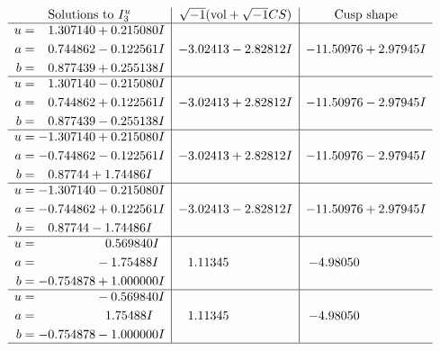 \documentclass[1p]{elsarticle_modified}
\theoremstyle{definition}
\newcommand{\I}{\sqrt{-1}}
\begin{document}
$$\begin{array}{c|c|c}  
\text{Solutions to }I^u_{3}& \I (\text{vol} + \sqrt{-1}CS) & \text{Cusp shape}\\
 \hline 
\begin{aligned}
u &= \phantom{-}1.307140 + 0.215080 I \\
a &= \phantom{-}0.744862 - 0.122561 I \\
b &= \phantom{-}0.877439 + 0.255138 I\end{aligned}
 & -3.02413 - 2.82812 I & -11.50976 + 2.97945 I \\ \hline\begin{aligned}
u &= \phantom{-}1.307140 - 0.215080 I \\
a &= \phantom{-}0.744862 + 0.122561 I \\
b &= \phantom{-}0.877439 - 0.255138 I\end{aligned}
 & -3.02413 + 2.82812 I & -11.50976 - 2.97945 I \\ \hline\begin{aligned}
u &= -1.307140 + 0.215080 I \\
a &= -0.744862 - 0.122561 I \\
b &= \phantom{-}0.87744 + 1.74486 I\end{aligned}
 & -3.02413 + 2.82812 I & -11.50976 - 2.97945 I \\ \hline\begin{aligned}
u &= -1.307140 - 0.215080 I \\
a &= -0.744862 + 0.122561 I \\
b &= \phantom{-}0.87744 - 1.74486 I\end{aligned}
 & -3.02413 - 2.82812 I & -11.50976 + 2.97945 I \\ \hline\begin{aligned}
u &= \phantom{-0.000000 -}0.569840 I \\
a &= \phantom{-0.000000 } -1.75488 I \\
b &= -0.754878 + 1.000000 I\end{aligned}
 & \phantom{-}1.11345\phantom{ +0.000000I} & -4.98050\phantom{ +0.000000I} \\ \hline\begin{aligned}
u &= \phantom{-0.000000 } -0.569840 I \\
a &= \phantom{-0.000000 -}1.75488 I \\
b &= -0.754878 - 1.000000 I\end{aligned}
 & \phantom{-}1.11345\phantom{ +0.000000I} & -4.98050\phantom{ +0.000000I}\\
 \hline 
 \end{array}$$\newpage
\end{document}
